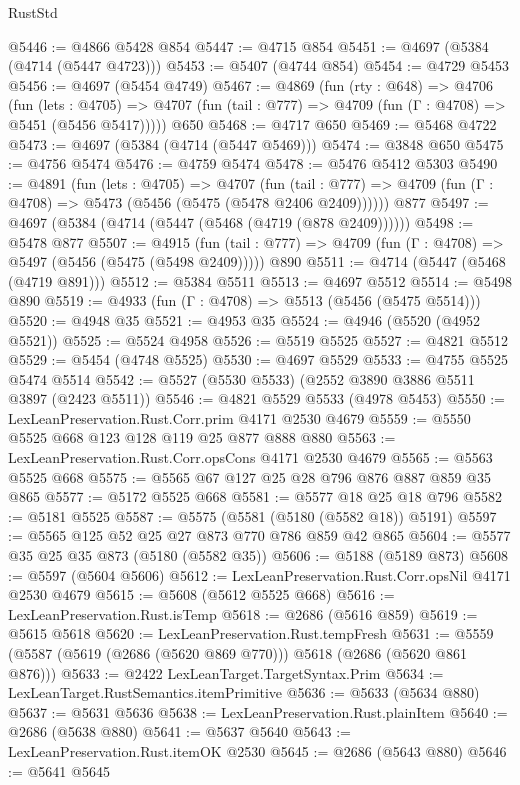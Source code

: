 \begin{lexlean}{RustStd}
\begin{coremodule}
@5446 := @4866 @5428 @854
@5447 := @4715 @854
@5451 := @4697 (@5384 (@4714 (@5447 @4723)))
@5453 := @5407 (@4744 @854)
@5454 := @4729 @5453
@5456 := @4697 (@5454 @4749)
@5467 := @4869
    (fun (rty : @648) =>
    @4706
      (fun (lets : @4705) =>
      @4707 (fun (tail : @777) => @4709 (fun (Γ : @4708) => @5451 (@5456 @5417)))))
    @650
@5468 := @4717 @650
@5469 := @5468 @4722
@5473 := @4697 (@5384 (@4714 (@5447 @5469)))
@5474 := @3848 @650
@5475 := @4756 @5474
@5476 := @4759 @5474
@5478 := @5476 @5412 @5303
@5490 := @4891
    (fun (lets : @4705) =>
    @4707
      (fun (tail : @777) => @4709 (fun (Γ : @4708) => @5473 (@5456 (@5475 (@5478 @2406 @2409))))))
    @877
@5497 := @4697 (@5384 (@4714 (@5447 (@5468 (@4719 (@878 @2409))))))
@5498 := @5478 @877
@5507 := @4915
    (fun (tail : @777) => @4709 (fun (Γ : @4708) => @5497 (@5456 (@5475 (@5498 @2409)))))
    @890
@5511 := @4714 (@5447 (@5468 (@4719 @891)))
@5512 := @5384 @5511
@5513 := @4697 @5512
@5514 := @5498 @890
@5519 := @4933 (fun (Γ : @4708) => @5513 (@5456 (@5475 @5514)))
@5520 := @4948 @35
@5521 := @4953 @35
@5524 := @4946 (@5520 (@4952 @5521))
@5525 := @5524 @4958
@5526 := @5519 @5525
@5527 := @4821 @5512
@5529 := @5454 (@4748 @5525)
@5530 := @4697 @5529
@5533 := @4755 @5525 @5474 @5514
@5542 := @5527 (@5530 @5533) (@2552 @3890 @3886 @5511 @3897 (@2423 @5511))
@5546 := @4821 @5529 @5533 (@4978 @5453)
@5550 := LexLeanPreservation.Rust.Corr.prim @4171 @2530 @4679
@5559 := @5550 @5525 @668 @123 @128 @119 @25 @877 @888 @880
@5563 := LexLeanPreservation.Rust.Corr.opsCons @4171 @2530 @4679
@5565 := @5563 @5525 @668
@5575 := @5565 @67 @127 @25 @28 @796 @876 @887 @859 @35 @865
@5577 := @5172 @5525 @668
@5581 := @5577 @18 @25 @18 @796
@5582 := @5181 @5525
@5587 := @5575 (@5581 (@5180 (@5582 @18)) @5191)
@5597 := @5565 @125 @52 @25 @27 @873 @770 @786 @859 @42 @865
@5604 := @5577 @35 @25 @35 @873 (@5180 (@5582 @35))
@5606 := @5188 (@5189 @873)
@5608 := @5597 (@5604 @5606)
@5612 := LexLeanPreservation.Rust.Corr.opsNil @4171 @2530 @4679
@5615 := @5608 (@5612 @5525 @668)
@5616 := LexLeanPreservation.Rust.isTemp
@5618 := @2686 (@5616 @859)
@5619 := @5615 @5618
@5620 := LexLeanPreservation.Rust.tempFresh
@5631 := @5559 (@5587 (@5619 (@2686 (@5620 @869 @770))) @5618 (@2686 (@5620 @861 @876)))
@5633 := @2422 LexLeanTarget.TargetSyntax.Prim
@5634 := LexLeanTarget.RustSemantics.itemPrimitive
@5636 := @5633 (@5634 @880)
@5637 := @5631 @5636
@5638 := LexLeanPreservation.Rust.plainItem
@5640 := @2686 (@5638 @880)
@5641 := @5637 @5640
@5643 := LexLeanPreservation.Rust.itemOK @2530
@5645 := @2686 (@5643 @880)
@5646 := @5641 @5645

\end{coremodule}
\end{lexlean}
